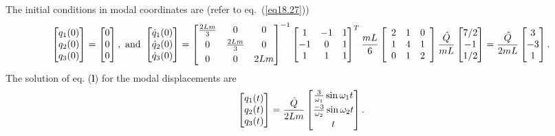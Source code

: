 \documentclass{AeroStructure-ERJohnson}
\begin{document}
\begin{example*}
The initial conditions in modal coordinates are (refer to eq.~(\ref{eq18.27}))
\begin{align}\label{ex18.2m}
\left[\begin{array}{@{}l@{}}q_{1}(0) \\q_{2}(0) \\q_{3}(0)\end{array}\right]=\left[\begin{array}{@{}l@{}}0 \\0 \\0\end{array}\right],\text{ and }\left[\begin{array}{@{}l@{}}\dot{q}_{1}(0) \\\dot{q}_{2}(0) \\\dot{q}_{3}(0)\end{array}\right]=\left[\begin{array}{@{}ccc@{}}\frac{2 L m}{3} & 0 & 0 \\[3pt] 0 & \frac{2 L m}{3} & 0 \\[3pt] 0 & 0 & 2 L m\end{array}\right]^{-1}\left[\begin{array}{@{}ccc@{}}1 & -1 & 1 \\-1 & 0 & 1 \\1 & 1 & 1\end{array}\right]^{T} \frac{m L}{6}\left[\begin{array}{lll}2 & 1 & 0 \\1 & 4 & 1 \\0 & 1 & 2\end{array}\right] \frac{\hat{Q}}{m L}\left[\begin{array}{@{}c@{}}7/2 \\-1 \\1/2\end{array}\right]=\frac{\hat{Q}}{2 m L}\left[\begin{array}{@{}c@{}}3 \\-3 \\1\end{array}\right].
\end{align}
The solution of eq. (\textbf{l}) for the modal displacements are
\begin{align}\label{ex18.2n}
\left[\begin{array}{@{}l@{}}q_{1}(t) \\q_{2}(t) \\q_{3}(t)\end{array}\right]=\frac{\hat{Q}}{2 L m}\left[\begin{array}{@{}c@{}}\frac{3}{\omega_{1}} \sin \omega_{1} t \\[3pt] \frac{-3}{\omega_{2}} \sin \omega_{2} t \\[3pt] t\end{array}\right].

\end{align}
\end{example*}
\end{document}
